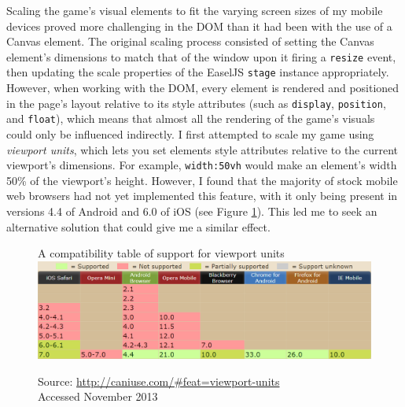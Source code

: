 \documentclass[final]{cmpreport}
\begin{document}
Scaling the game's visual elements to fit the varying screen sizes of my mobile devices proved more challenging in the DOM than it had been with the use of a Canvas element. The original scaling process consisted of setting the Canvas element's dimensions to match that of the window upon it firing a \texttt{resize} event, then updating the scale properties of the EaselJS \texttt{stage} instance appropriately. However, when working with the DOM, every element is rendered and positioned in the page's layout relative to its style attributes (such as \texttt{display}, \texttt{position}, and \texttt{float}), which means that almost all the rendering of the game's visuals could only be influenced indirectly. I first attempted to scale my game using \textit{viewport units}, which lets you set elements style attributes relative to the current viewport's dimensions. For example, \texttt{width:50vh} would make an element's width 50\% of the viewport's height. However, I found that the majority of stock mobile web browsers had not yet implemented this feature, with it only being present in versions 4.4 of Android and 6.0 of iOS (see Figure \ref{viewport}). This led me to seek an alternative solution that could give me a similar effect.

\begin{figure}[h]{A compatibility table of support for viewport units \label{viewport}}
  \includegraphics[width=1.0\textwidth]{viewportunits.png}
    \begin{tablenotes}
      \item Source: \url{http://caniuse.com/\#feat=viewport-units}\\ Accessed November 2013
    \end{tablenotes}
\end{figure}
\end{document}
